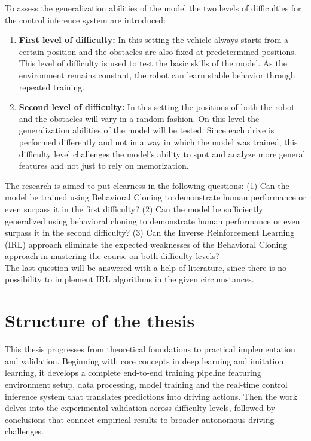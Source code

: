 To assess the generalization abilities of the model the two levels of difficulties for the control inference system are introduced:
\begin{enumerate}
  \item \textbf{First level of difficulty:} In this setting the vehicle always starts from a certain position and the obstacles are also fixed at predetermined positions. This level of difficulty is used to test the basic skills of the model. As the environment remains constant, the robot can learn stable behavior through repeated training.
  \item \textbf{Second level of difficulty:} In this setting the positions of both the robot and the obstacles will vary in a random fashion. On this level the generalization abilities of the model will be tested. Since each drive is performed differently and not in a way in which the model was trained, this difficulty level challenges the model's ability to spot and analyze more general features and not just to rely on memorization.
\end{enumerate}

The research is aimed to put clearness in the following questions: (1) Can the model be trained using Behavioral Cloning \autocite{5152385} to demonstrate human performance or even surpass it in the first difficulty? (2) Can the model be sufficiently generalized using behavioral cloning to demonstrate human performance or even surpass it in the second difficulty? (3) Can the Inverse Reinforcement Learning (IRL) \autocite{ng2000algorithms} \autocite{neu2012apprenticeshiplearningusinginverse} \autocites{lee2021approximateinversereinforcementlearning} approach eliminate the expected weaknesses of the Behavioral Cloning approach in mastering the course on both difficulty levels? \\
The last question will be answered with a help of literature, since there is no possibility to implement IRL algorithms in the given circumstances.

\section{Structure of the thesis}

This thesis progresses from theoretical foundations to practical implementation and validation. Beginning with core concepts in deep learning and imitation learning, it develops a complete end-to-end training pipeline featuring environment setup, data processing, model training and the real-time control inference system that translates predictions into driving actions. Then the work delves into the experimental validation across difficulty levels, followed by conclusions that connect empirical results to broader autonomous driving challenges.